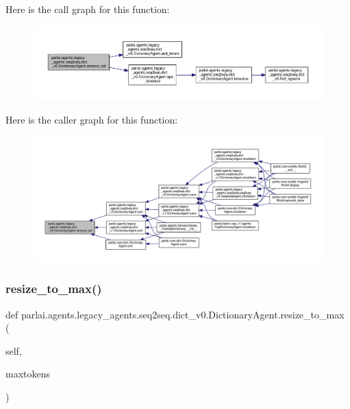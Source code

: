 Here is the call graph for this function\+:
\nopagebreak
\begin{figure}[H]
\begin{center}
\leavevmode
\includegraphics[width=350pt]{classparlai_1_1agents_1_1legacy__agents_1_1seq2seq_1_1dict__v0_1_1DictionaryAgent_accabae63114f30e336e560ee1b7420da_cgraph}
\end{center}
\end{figure}
Here is the caller graph for this function\+:
\nopagebreak
\begin{figure}[H]
\begin{center}
\leavevmode
\includegraphics[width=350pt]{classparlai_1_1agents_1_1legacy__agents_1_1seq2seq_1_1dict__v0_1_1DictionaryAgent_accabae63114f30e336e560ee1b7420da_icgraph}
\end{center}
\end{figure}
\mbox{\label{classparlai_1_1agents_1_1legacy__agents_1_1seq2seq_1_1dict__v0_1_1DictionaryAgent_ab5351c542cbfdeeb9a2bc24227253fb3}} 
\subsubsection{\texorpdfstring{resize\+\_\+to\+\_\+max()}{resize\_to\_max()}}
{\footnotesize\ttfamily def parlai.\+agents.\+legacy\+\_\+agents.\+seq2seq.\+dict\+\_\+v0.\+Dictionary\+Agent.\+resize\+\_\+to\+\_\+max (\begin{DoxyParamCaption}\item[{}]{self,  }\item[{}]{maxtokens }\end{DoxyParamCaption})}

